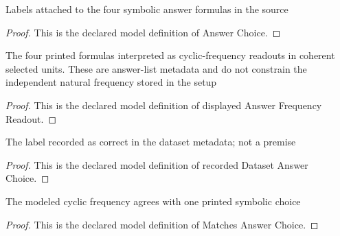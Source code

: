 \begin{definition}
  \label{def:physics:phyx-mini-0203:phyxminiproblems-problemphyxmini0203-answerchoice}
  Labels attached to the four symbolic answer formulas in the source
\end{definition}
\begin{proof}
  This is the declared model definition of Answer Choice.
\end{proof}
\begin{definition}
  \label{def:physics:phyx-mini-0203:phyxminiproblems-problemphyxmini0203-displayedanswerfrequencyreadout}
  The four printed formulas interpreted as cyclic-frequency readouts in coherent selected units. These are answer-list metadata and do not constrain the independent natural frequency stored in the setup
\end{definition}
\begin{proof}
  This is the declared model definition of displayed Answer Frequency Readout.
\end{proof}
\begin{definition}
  \label{def:physics:phyx-mini-0203:phyxminiproblems-problemphyxmini0203-recordeddatasetanswerchoice}
  The label recorded as correct in the dataset metadata; not a premise
\end{definition}
\begin{proof}
  This is the declared model definition of recorded Dataset Answer Choice.
\end{proof}
\begin{definition}
  \label{def:physics:phyx-mini-0203:phyxminiproblems-problemphyxmini0203-matchesanswerchoice}
  The modeled cyclic frequency agrees with one printed symbolic choice
\end{definition}
\begin{proof}
  This is the declared model definition of Matches Answer Choice.
\end{proof}
